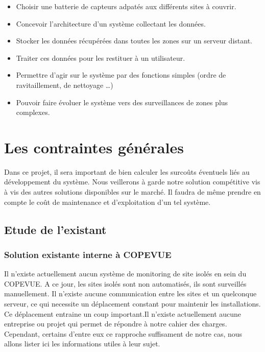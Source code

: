 \begin{itemize}
\item Choisir une batterie de capteurs adpatés aux différents sites à couvrir.
\item Concevoir l'architecture d'un système collectant les données.
\item Stocker les données récupérées dans toutes les zones sur un serveur distant.
\item Traiter ces données pour les restituer à un utilisateur.
\item Permettre d'agir sur le système par des fonctions simples (ordre de ravitaillement, de nettoyage …)
\item Pouvoir faire évoluer le système vers des surveillances de zones plus complexes.
\end{itemize}
    
\section{Les contraintes générales}
Dans ce projet, il sera important de bien calculer les surcoûts éventuels liés au développement du système. Nous veillerons à garde notre solution compétitive vis à vis des autres solutions disponibles sur le marché. Il faudra de même prendre en compte le coût de maintenance et d'exploitation d'un tel système.

\subsection{Etude de l'existant}
\subsubsection{Solution existante interne à COPEVUE}
Il n’existe actuellement aucun système de monitoring de site isolés en sein du COPEVUE. A ce jour, les sites isolés sont non automatisés, ils sont surveillés manuellement. Il n’existe aucune communication entre les sites et un quelconque serveur, ce qui necessite un déplacement constant pour maintenir les installations. Ce déplacement entraine un coup important.Il n’existe actuellement aucune entreprise ou projet qui permet de répondre à notre cahier des charges. Cependant, certains d’entre eux ce rapproche suffisament de notre cas, nous allons lister ici les informations utiles à leur sujet.
